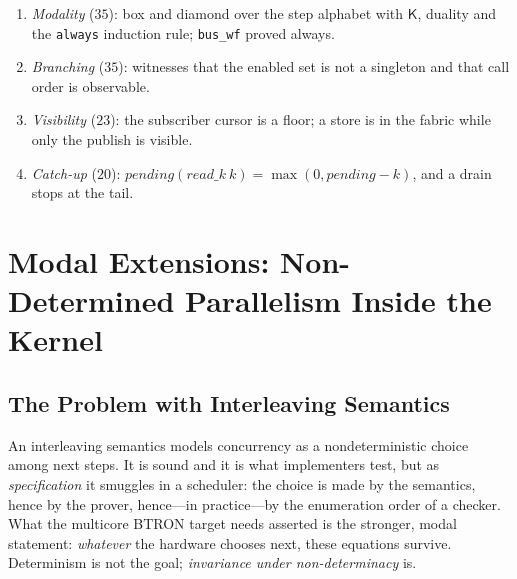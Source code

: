 \documentclass[10pt,journal,compsoc,twocolumn]{article}
\theoremstyle{definition}
\theoremstyle{remark}
\theoremstyle{plain}
\newcommand{\ctr}[1]{\texttt{#1}}
\begin{document}
\begin{enumerate}[leftmargin=*,itemsep=0pt,topsep=2pt]
    equality.
    \item[\textbf{I13}] \emph{Modality} (\(35\)): box and diamond over the step
    alphabet with \(\mathsf{K}\), duality and the \ctr{always} induction rule;
    \ctr{bus\_wf} proved always.
    \item[\textbf{I14}] \emph{Branching} (\(35\)): witnesses that the enabled set
    is not a singleton and that call order is observable.
    \item[\textbf{I15}] \emph{Visibility} (\(23\)): the subscriber cursor is a
    floor; a store is in the fabric while only the publish is visible.
    \item[\textbf{I16}] \emph{Catch-up} (\(20\)):
    \(\mathit{pending}(\mathit{read\_k}\ k)=\max(0,\mathit{pending}-k)\), and a
    drain stops at the tail.
\end{enumerate}

\section{Modal Extensions: Non-Determined Parallelism Inside the Kernel}
\label{sec:modal}

\subsection{The Problem with Interleaving Semantics}
An interleaving semantics models concurrency as a nondeterministic choice among next steps. It is sound and it is what implementers test, but as \emph{specification} it smuggles in a scheduler: the choice is made by the semantics, hence by the prover, hence---in practice---by the enumeration order of a checker. What the multicore BTRON target needs asserted is the stronger, modal statement: \emph{whatever} the hardware chooses next, these equations survive. Determinism is not the goal; \emph{invariance under non-determinacy} is.
\end{document}
